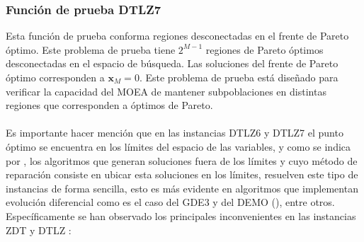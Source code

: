 \subsubsection*{Función de prueba DTLZ7}
Esta función de prueba conforma regiones desconectadas en el frente de Pareto óptimo.
%
Este problema de prueba tiene $2^{M-1}$ regiones de Pareto óptimos desconectadas en el espacio de búsqueda.
%
Las soluciones del frente de Pareto óptimo corresponden a $\mathbf{x}_M = 0$.
%
Este problema de prueba está diseñado para verificar la capacidad del MOEA de mantener subpoblaciones en distintas regiones que corresponden a óptimos de Pareto. 
\\ \\
Es importante hacer mención que en las instancias DTLZ6 y DTLZ7 el punto óptimo se encuentra en los límites del espacio de las variables, y como se indica por \citeauthor{Joel:ComparativoDEMO_FalloDTLZ6}, los algoritmos que generan soluciones fuera de los límites y cuyo método de reparación consiste en ubicar esta soluciones en los límites, resuelven este tipo de instancias de forma sencilla, esto es más evidente en algoritmos que implementan evolución diferencial como es el caso del GDE3 y del DEMO (\cite{Joel:ComparativoDEMO_FalloDTLZ6}), entre otros.
%
Específicamente se han observado los principales inconvenientes en las instancias ZDT y DTLZ \citep{Joel:CEC2009}:
